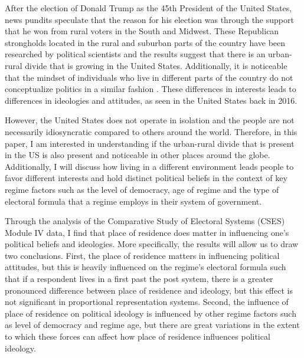 \documentclass[12pt, titlepage]{article}
\begin{document}
\listoftables
\clearpage

\listoffigures
\clearpage


After the election of Donald Trump as the 45th President of the United States, news pundits speculate that the reason for his election was through the support that he won from rural voters in the South and Midwest. These Republican strongholds located in the rural and suburban parts of the country have been researched by political scientists \citep{walsh_putting_2012} and the results suggest that there is an urban-rural divide that is growing in the United States. Additionally, it is noticeable that the mindset of individuals who live in different parts of the country do not conceptualize politics in a similar fashion \citep{holloway_burning_2007}. These differences in interests leads to differences in ideologies and attitudes, as seen in the United States back in 2016.

However, the United States does not operate in isolation and the people are not necessarily idiosyncratic compared to others around the world. Therefore, in this paper, I am interested in understanding if the urban-rural divide that is present in the US is also present and noticeable in other places around the globe. Additionally, I  will discuss how living in a different environment leads people to favor different interests and hold distinct political beliefs in the context of key regime factors such as the level of democracy, age of regime and the type of electoral formula that a regime employs in their system of government.

Through the analysis of the Comparative Study of Electoral Systems (CSES) Module IV data, I find that place of residence does matter in influencing one's political beliefs and ideologies. More specifically, the results will allow us to draw two conclusions. First, the place of residence matters in influencing political attitudes, but this is heavily influenced on the regime's electoral formula such that if a respondent lives in a first past the post system, there is a greater pronounced difference between place of residence and ideology, but this effect is not significant in proportional representation systems. Second, the influence of place of residence on political ideology is influenced by other regime factors such as level of democracy and regime age, but there are great variations in the extent to which these forces can affect how place of residence influences political ideology.
\end{document}
